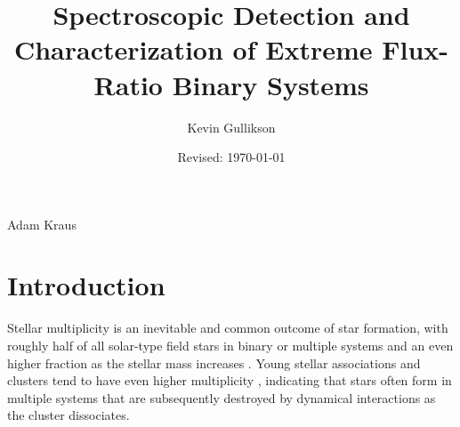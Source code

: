 \documentclass{utthesis}
\begin{document}
\author{Kevin Gullikson}
\title{Spectroscopic Detection and Characterization of Extreme Flux-Ratio Binary Systems}
\date{Revised: \today}

\UTcopyrightlegend %

\begin{UTcommittee}
\end{UTcommittee}


\frontmatter

\setcounter{page}{4}

%
%

\begin{UTabstract}{Adam Kraus}
\lipsum[1]
\end{UTabstract}


\tableofcontents

\listoffigures

\mainmatter

\chapter{Introduction}

Stellar multiplicity is an inevitable and common outcome of star formation, with roughly half of all solar-type field stars in binary or multiple systems \citep{Raghavan2010} and an even higher fraction as the stellar mass increases \citep{Zinnecker2007}. Young stellar associations and clusters tend to have even higher multiplicity \citep{Duchene2013}, indicating that stars often form in multiple systems that are subsequently destroyed by dynamical interactions as the cluster dissociates. 
\end{document}
